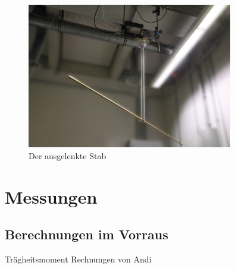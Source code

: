 \documentclass[11pt]{scrartcl}
\begin{document}
\begin{figure}[ht]
\begin{center}
\includegraphics[width=0.8\textwidth]{images/stab-fertig.jpg}
\end{center}
\vspace{-1.5\baselineskip}
\caption{Der ausgelenkte Stab}
\label{stab-fertig}
\end{figure}

\section{Messungen}
\subsection{Berechnungen im Vorraus} %
Tr\"agheitsmoment Rechnungen von Andi
\end{document}
